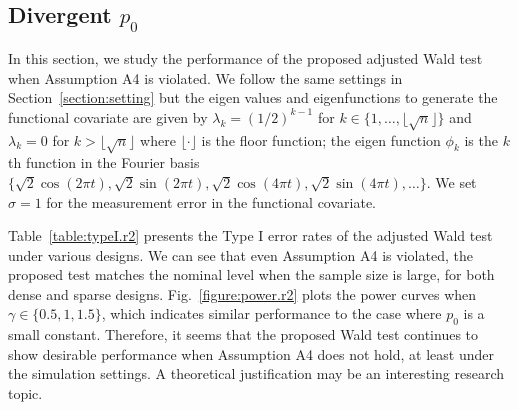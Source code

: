\documentclass[times,sort&compress,3p]{elsarticle}
\theoremstyle{plain}%
\theoremstyle{definition}
\begin{document}
\subsection{Divergent $p_0$}
\label{section:large.p.0} 
In this section, we study the performance of the proposed adjusted Wald test when Assumption A4 is violated.  We follow the same settings in Section~\ref{section:setting} but the eigen values and eigenfunctions to generate the functional covariate are given by
$\lambda_k = (1/2)^{k - 1}$ for $k \in \{1, \ldots, \lfloor\sqrt{n} \rfloor\}$ and $\lambda_k = 0$ for $k > \lfloor\sqrt{n} \rfloor$ where $\lfloor \cdot \rfloor$ is the floor function; the eigen function $\phi_k$ is the $k$th function in the Fourier basis $\{\sqrt{2} \cos(2 \pi t), \sqrt{2} \sin(2 \pi t), \sqrt{2} \cos( 4 \pi t), \sqrt{2} \sin(4 \pi t), \ldots \}$. We set $\sigma = 1$ for the measurement error in the functional covariate. 

Table~\ref{table:typeI.r2} presents the Type I error rates of the adjusted Wald test under various designs. We can see that even Assumption A4 is violated, the proposed test matches the nominal level when the sample size is large, for both dense and sparse designs. Fig.~\ref{figure:power.r2} plots the power curves when $\gamma \in \{0.5, 1, 1.5\}$, which indicates similar performance to the case where $p_0$ is a small constant. Therefore, it seems that the proposed Wald test continues to show desirable performance when Assumption A4 does not hold, at least under the simulation settings. A theoretical justification may be an interesting research topic. 
\end{document}
